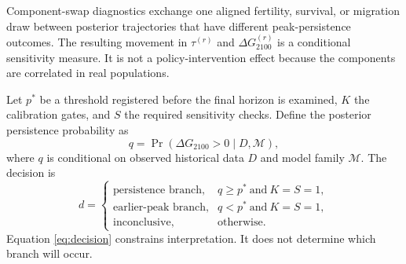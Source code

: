 \documentclass[conference]{IEEEtran}
\begin{document}
Component-swap diagnostics exchange one aligned fertility, survival, or migration draw between posterior trajectories that have different peak-persistence outcomes. The resulting movement in $\tau^{(r)}$ and $\Delta G_{2100}^{(r)}$ is a conditional sensitivity measure. It is not a policy-intervention effect because the components are correlated in real populations.

Let $p^*$ be a threshold registered before the final horizon is examined, $K$ the calibration gates, and $S$ the required sensitivity checks. Define the posterior persistence probability as
\begin{equation}
q=\Pr(\Delta G_{2100}>0\mid D,\mathcal{M}),
\label{eq:persistence_probability}
\end{equation}
where $q$ is conditional on observed historical data $D$ and model family $\mathcal{M}$. The decision is
\begin{equation}
d=\begin{cases}
\text{persistence branch}, & q\geq p^*\ \text{and}\ K=S=1,\\
\text{earlier-peak branch}, & q<p^*\ \text{and}\ K=S=1,\\
\text{inconclusive}, & \text{otherwise}.
\end{cases}
\label{eq:decision}
\end{equation}
Equation \eqref{eq:decision} constrains interpretation. It does not determine which branch will occur.
\end{document}
